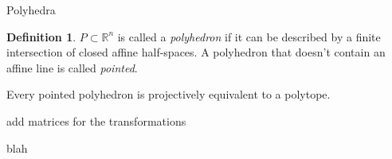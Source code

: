 \documentclass[9pt]{beamer}
\newcommand\R{\mathbb{R}}
\newcommand\set[1]{\{#1\}}
\theoremstyle{definition}
\newtheorem{defn}{Definition}
\begin{document}
\begin{frame}[fragile]{Polyhedra}
  \begin{defn}
    $P \subset \R^n$ is called a \emph{polyhedron} if it can be described by a finite
    intersection of closed affine half-spaces. A polyhedron that doesn't contain an affine
    line is called \emph{pointed}.
  \end{defn}

  \begin{theorem}
    Every pointed polyhedron is projectively equivalent to a polytope. 
  \end{theorem}

  add matrices for the transformations
\end{frame}




\begin{frame}[fragile]{}
  blah
\end{frame}

\end{document}
